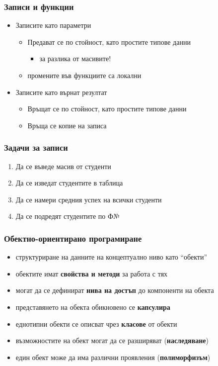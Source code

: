 \documentclass[alsotrans]{beamerswitch}
\begin{document}
\begin{frame}
  \frametitle{Записи и функции}

  \begin{itemize}[<+->]
  \item Записите като параметри
    \begin{itemize}
    \item Предават се \alert{по стойност}, като простите типове данни
      \begin{itemize}
      \item за разлика от масивите!
      \end{itemize}
    \item промените във функциите са локални
    \end{itemize}
  \item Записите като върнат резултат
    \begin{itemize}
    \item Връщат се \alert{по стойност}, като простите типове данни
    \item Връща се копие на записа
    \end{itemize}
  \end{itemize}
\end{frame}

\begin{frame}
  \frametitle{Задачи за записи}

  \begin{enumerate}[<+->]
  \item Да се въведе масив от студенти
  \item Да се изведат студентите в таблица
  \item Да се намери средния успех на всички студенти
  \item<0> Да се подредят студентите по Ф№
  \end{enumerate}
\end{frame}

\begin{frame}
  \frametitle{Обектно-ориентирано програмиране}

  \begin{itemize}
  \item структуриране на данните на концептуално ниво като ``обекти''
  \item обектите имат \textbf{свойства и методи} за работа с тях
  \item могат да се дефинират \textbf{нива на достъп} до компоненти на обекта
  \item представянето на обекта обикновено се \textbf{капсулира}
  \item еднотипни обекти се описват чрез \textbf{класове} от обекти
  \item възможностите на обект могат да се разширяват (\textbf{наследяване})
  \item един обект може да има различни проявления (\textbf{полиморфизъм})
  \end{itemize}
\end{frame}
\end{document}
